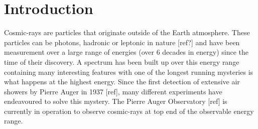 \chapter*{\centering Introduction \\}\label{Ch:Intro}



Cosmic-rays are particles that originate outside of the Earth atmosphere. These particles can be photons, hadronic or leptonic in nature [ref?] and have been measurement over a large range of energies (over 6 decades in energy) since the time of their discovery. A spectrum has been built up over this energy range containing many interesting features with one of the longest running mysteries is what happens at the highest energy.  Since the first detection of extensive air showers by Pierre Auger in 1937 [ref], many different experiments have endeavoured to solve this mystery. The Pierre Auger Observatory [ref] is currently in operation to observe cosmic-rays at top end of the observable energy range.




